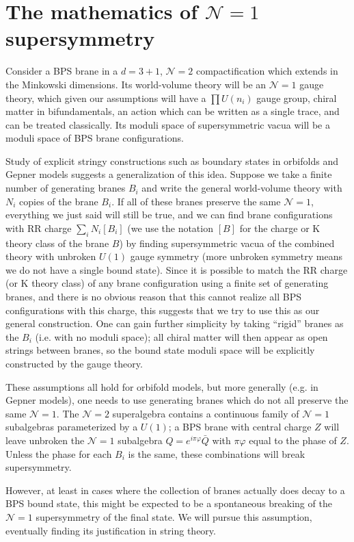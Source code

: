 \documentclass[a4paper,12pt]{amsart}
\numberwithin{equation}{section}
\theoremstyle{plain}
\theoremstyle{definition}
\def\grade{\varphi}
\def\cal{\mathcal}
\def\CN{{\cal N}}
\begin{document}
\section{The mathematics of $\CN=1$ supersymmetry}

Consider a BPS brane in a $d=3+1$, $\CN=2$ compactification which
extends in the Minkowski dimensions.  Its world-volume theory will be
an $\CN=1$ gauge theory, which given our assumptions will have a
$\prod U(n_i)$ gauge group, chiral matter in bifundamentals, an action
which can be written as a single trace, and can be treated
classically.  Its moduli space of supersymmetric vacua will be a
moduli space of BPS brane configurations.

Study of explicit stringy constructions such as boundary states in
orbifolds and Gepner models suggests a generalization of this
idea.  Suppose we take a finite number of generating branes $B_i$ and
write the general world-volume theory with $N_i$ copies of the brane
$B_i$.  If all of these branes preserve the same $\CN=1$, everything
we just said will still be true, and we can find brane configurations
with RR charge $\sum_i N_i [B_i]$ (we use the notation $[B]$ for the
charge or K theory class of the brane $B$) by finding supersymmetric
vacua of the combined theory with unbroken $U(1)$ gauge symmetry (more
unbroken symmetry means we do not have a single bound state).  Since
it is possible to match the RR charge (or K theory class) of any brane
configuration using a finite set of generating branes, and there is no
obvious reason that this cannot realize all BPS configurations with
this charge, this suggests that we try to use this as our general
construction.  One can gain further simplicity by taking ``rigid''
branes as the $B_i$ (i.e. with no moduli space); all chiral matter
will then appear as open strings between branes, so the bound state
moduli space will be explicitly constructed by the gauge theory.

These assumptions all hold for orbifold models, but more generally
(e.g. in Gepner models), one needs to use generating branes which do
not all preserve the same $\CN=1$.  The $\CN=2$ superalgebra contains
a continuous family of $\CN=1$ subalgebras parameterized by a $U(1)$;
a BPS brane with central charge $Z$ will leave unbroken the $\CN=1$
subalgebra $Q = e^{i\pi\grade}\bar Q$ with $\pi\grade$ equal to the phase
of $Z$.  Unless the phase for each $B_i$ is the same, these
combinations will break supersymmetry.

However, at least in cases where the collection of branes actually
does decay to a BPS bound state, this might be expected to be a
spontaneous breaking of the $\CN=1$ supersymmetry of the final state.
We will pursue this assumption, eventually finding its justification
in string theory.
\end{document}

